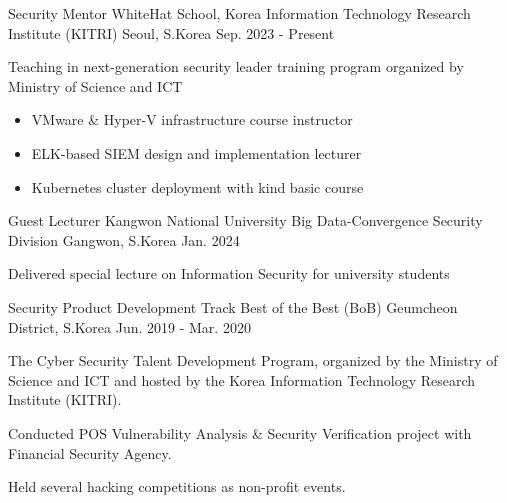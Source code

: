 
\begin{cventries}

\cventry
  {Security Mentor} %
  {WhiteHat School, Korea Information Technology Research Institute (KITRI)} %
  {Seoul, S.Korea} %
  {Sep. 2023 - Present} %
  {
    \begin{cvitems}
      \item {Teaching in next-generation security leader training program organized by Ministry of Science and ICT}
      \begin{itemize}
        \item {VMware \& Hyper-V infrastructure course instructor}
        \item {ELK-based SIEM design and implementation lecturer}
        \item {Kubernetes cluster deployment with kind basic course}
      \end{itemize}
    \end{cvitems}
  }

\cventry
  {Guest Lecturer} %
  {Kangwon National University Big Data-Convergence Security Division} %
  {Gangwon, S.Korea} %
  {Jan. 2024} %
  {
    \begin{cvitems}
      \item {Delivered special lecture on Information Security for university students}
    \end{cvitems}
  }

\cventry
  {Security Product Development Track} %
  {Best of the Best (BoB)} %
  {Geumcheon District, S.Korea} %
  {Jun. 2019 - Mar. 2020} %
  {
    \begin{cvitems}
      \item {The Cyber Security Talent Development Program, organized by the Ministry of Science and ICT and hosted by the Korea Information Technology Research Institute (KITRI).}
      \item {Conducted POS Vulnerability Analysis \& Security Verification project with Financial Security Agency.}
      \item {Held several hacking competitions as non-profit events.}
    \end{cvitems}
  }


\end{cventries}
